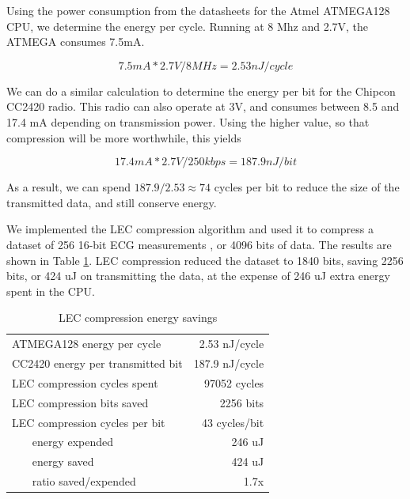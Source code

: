 Using the power consumption from the datasheets for the Atmel ATMEGA128 \cite{Atmel:ATMEGA128Datasheet} CPU, we determine the energy per cycle. Running at 8 Mhz and 2.7V, the ATMEGA consumes 7.5mA.

\begin{equation}
	7.5mA * 2.7V / 8MHz = 2.53nJ / cycle  
\end{equation}

We can do a similar calculation to determine the energy per bit for the Chipcon CC2420 radio.  This radio can also operate at 3V, and consumes between 8.5 and 17.4 mA depending on transmission power. Using the higher value, so that compression will be more worthwhile, this yields

\begin{equation}
  17.4mA * 2.7V / 250kbps = 187.9nJ / bit
\end{equation}

As a result, we can spend $187.9/2.53 \approx 74$ cycles per bit to reduce the size of the transmitted data, and still conserve energy.

We implemented the LEC compression algorithm and used it to compress a dataset of 256 16-bit ECG measurements \cite{physionet-ecg-data}, or 4096 bits of data. The results are shown in Table \ref{tbl-lec-energy}. LEC compression reduced the dataset to 1840 bits, saving 2256 bits, or 424 uJ on transmitting the data, at the expense of 246 uJ extra energy spent in the CPU.

\begin{table}[H]
\centering
\caption{LEC compression energy savings}
\label{tbl-lec-energy}
\begin{tabular}{lr}
\toprule
\midrule
ATMEGA128 energy per cycle            & 2.53 nJ/cycle  \\
CC2420 energy per transmitted bit     & 187.9 nJ/cycle  \\
\midrule
LEC compression cycles spent          & 97052 cycles\\
LEC compression bits saved            & 2256 bits \\
LEC compression cycles per bit        & 43 cycles/bit \\
~~~ energy expended                   & 246 uJ \\
~~~ energy saved                      & 424 uJ \\
~~~ ratio saved/expended              & 1.7x \\
\bottomrule
\end{tabular}
\end{table}

